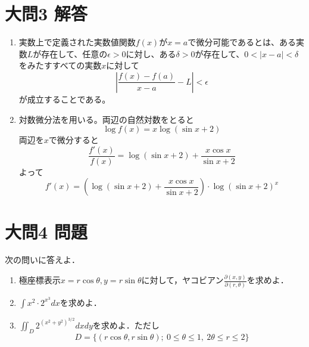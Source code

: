 \documentclass[dvipdfmx]{jsreport}
\begin{document}
\section{大問3 解答}
\begin{souanswer}
\begin{enumerate}
   \item 実数上で定義された実数値関数$f(x)$が$x= a$で微分可能であるとは、ある実数$L$が存在して、任意の$\epsilon> 0$に対し、ある$\delta> 0$が存在して、$0< |x- a|< \delta$をみたすすべての実数$x$に対して
\begin{equation*}
    \left|\frac{f(x)- f(a)}{x- a}- L\right|< \epsilon
\end{equation*}
    が成立することである。
    \item 対数微分法を用いる。両辺の自然対数をとると
\begin{equation*}
    \log{f(x)}= x\log(\sin{x}+ 2)
\end{equation*}
    両辺を$x$で微分すると
\begin{equation*}
    \frac{f'(x)}{f(x)}= \log(\sin{x}+ 2)+ \frac{x\cos{x}}{\sin{x}+ 2}
\end{equation*}
    よって
\begin{equation*}
    f'(x)= \left(\log(\sin{x}+ 2)+ \frac{x\cos{x}}{\sin{x}+ 2}\right)\cdot \log(\sin{x}+ 2)^x
\end{equation*}
\end{enumerate}
\end{souanswer}
\section{大問4 問題}
\begin{tcolorbox} %
	次の問いに答えよ．
\begin{enumerate}
	\item 極座標表示$x= r\cos{\theta}, y= r\sin{\theta}$に対して，ヤコビアン$\frac{\partial(x, y)}{\partial(r, \theta)}$を求めよ．
	\item $\int x^2\cdot 2^{x^3} dx$を求めよ．
	\item $\iint_{D} 2^{(x^2+ y^2)^{3/2}} dxdy$を求めよ．ただし
\begin{equation*}
	D= \{(r\cos{\theta}, r\sin{\theta});\ 0\le \theta\le 1,\ 2\theta\le r\le 2\}
\end{equation*}
\end{enumerate}
\end{tcolorbox}
\end{document}
